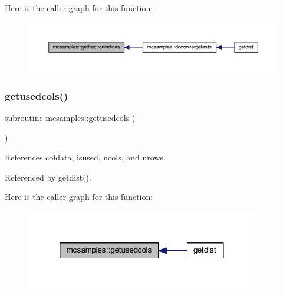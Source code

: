 Here is the caller graph for this function\+:
\nopagebreak
\begin{figure}[H]
\begin{center}
\leavevmode
\includegraphics[width=350pt]{namespacemcsamples_a45291f5f8d4db1ad22598222a511e67c_icgraph}
\end{center}
\end{figure}
\mbox{\label{namespacemcsamples_a4664c132197f4ef65fa541baac30f0f2}} 
\subsubsection{\texorpdfstring{getusedcols()}{getusedcols()}}
{\footnotesize\ttfamily subroutine mcsamples\+::getusedcols (\begin{DoxyParamCaption}{ }\end{DoxyParamCaption})}



References coldata, isused, ncols, and nrows.



Referenced by getdist().

Here is the caller graph for this function\+:
\nopagebreak
\begin{figure}[H]
\begin{center}
\leavevmode
\includegraphics[width=288pt]{namespacemcsamples_a4664c132197f4ef65fa541baac30f0f2_icgraph}
\end{center}
\end{figure}
\mbox{\label{namespacemcsamples_a1e8b234ac939c21f51884cab29fd0204}} 
